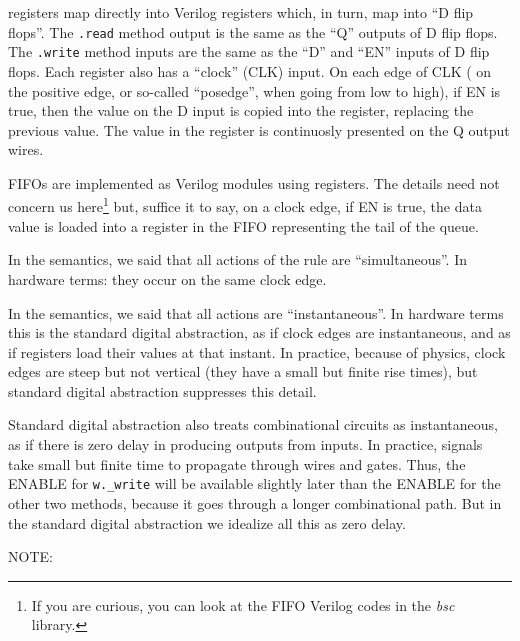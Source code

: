 {\BSV} registers map directly into Verilog registers which, in turn, map
into ``D flip flops''.  The \verb|.read| method output is the same as
the ``Q'' outputs of D flip flops.  The \verb|.write| method inputs
are the same as the ``D'' and ``EN'' inputs of D flip flops.  Each
register also has a ``clock'' (CLK) input.  On each edge of CLK ({\eg}
on the positive edge, or so-called ``posedge'', when going from low to
high), if EN is true, then the value on the D input is copied into the
register, replacing the previous value.  The value in the register is
continuosly presented on the Q output wires.

{\BSV} FIFOs are implemented as Verilog modules using registers.  The
details need not concern us here\footnote{If you are curious, you can
look at the FIFO Verilog codes in the \emph{bsc} library.} but,
suffice it to say, on a clock edge, if EN is true, the data value is
loaded into a register in the FIFO representing the tail of the queue.

In the semantics, we said that all actions of the rule are
``simultaneous''.  In hardware terms: they occur on the same clock
edge.

In the semantics, we said that all actions are ``instantaneous''.  In
hardware terms this is the standard digital abstraction, as if clock
edges are instantaneous, and as if registers load their values at that
instant.  In practice, because of physics, clock edges are steep but
not vertical (they have a small but finite rise times), but standard
digital abstraction suppresses this detail.

Standard digital abstraction also treats combinational circuits as
instantaneous, as if there is zero delay in producing outputs from
inputs.  In practice, signals take small but finite time to propagate
through wires and gates. Thus, the ENABLE for \verb|w._write| will be
available slightly later than the ENABLE for the other two methods,
because it goes through a longer combinational path.  But in the
standard digital abstraction we idealize all this as zero delay.

\vspace{2ex}

NOTE: 

